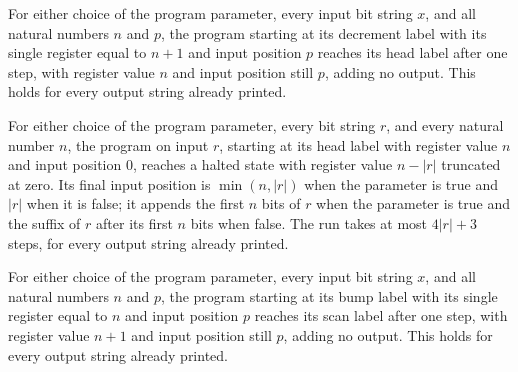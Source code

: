 \begin{theorem}
\label{Complexity.PrefixByLength.goes_dec_one}
\leanok
{}
For either choice of the program parameter, every input bit string $x$, and all natural
numbers $n$ and $p$, the program starting at its decrement label with its single
register equal to $n+1$ and input position $p$ reaches its head label after one step,
with register value $n$ and input position still $p$, adding no output. This holds for
every output string already printed.
\end{theorem}

\begin{theorem}
\label{Complexity.PrefixByLength.goes_payload}
\leanok
{}
For either choice of the program parameter, every bit string $r$, and every natural
number $n$, the program on input $r$, starting at its head label with register value $n$
and input position $0$, reaches a halted state with register value $n-|r|$ truncated at
zero. Its final input position is $\min(n,|r|)$ when the parameter is true and $|r|$
when it is false; it appends the first $n$ bits of $r$ when the parameter is true and
the suffix of $r$ after its first $n$ bits when false. The run takes at most $4|r|+3$
steps, for every output string already printed.
\end{theorem}

\begin{theorem}
\label{Complexity.PrefixByLength.goes_inc_one}
\leanok
{}
For either choice of the program parameter, every input bit string $x$, and all natural
numbers $n$ and $p$, the program starting at its bump label with its single register
equal to $n$ and input position $p$ reaches its scan label after one step, with register
value $n+1$ and input position still $p$, adding no output. This holds for every output
string already printed.
\end{theorem}

